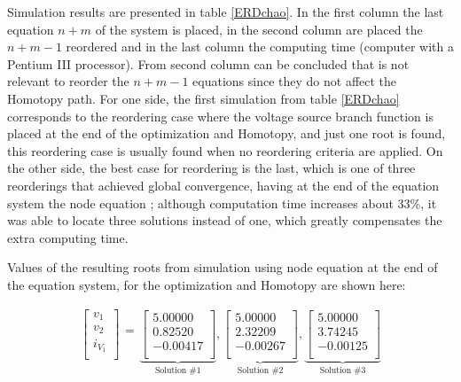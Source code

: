 \documentclass[conference,letterpaper,onecolumn,11pt]{IEEEtran}
\begin{document}
Simulation results are presented in table \ref{ERDchao}. In the first column the last equation $n+m$ of the system is placed, in the second column are placed the $n+m-1$ reordered and in the last column the computing time (computer with a Pentium III processor). From second column can be concluded that is not relevant to reorder the $n+m-1$ equations since they do not affect the Homotopy path. For one side, the first simulation from table \ref{ERDchao} corresponds to the reordering case where the voltage source branch function is placed at the end of the optimization and Homotopy, and just one root is found, this reordering case is usually found when no reordering criteria are applied. On the other side, the best case for reordering is the last, which is one of three reorderings that achieved global convergence, having at the end of the equation system the node equation ; although computation time increases about 33\%, it was able to locate three solutions instead of one, which greatly compensates the extra computing time.

Values of the resulting roots from simulation using node equation  at the end of the equation system, for the optimization and Homotopy are shown here:

\begin{displaymath}
\begin{array}{r}
\left[\begin{array}{r} v_1 \\ v_2  \\ i_{V_1}  \\ \end{array}\right]
\begin{array}{r}
 \\ = \\ \\
\end{array}
\underbrace{\left[\begin{array}{r}
5.00000 \\
0.82520  \\
-0.00417 \\
\end{array}\right]}_{\mbox{Solution \#1}},
\underbrace{\left[\begin{array}{r}
5.00000 \\
2.32209 \\
-0.00267 \\
\end{array}\right]}_{\mbox{Solution \#2}}, 
\underbrace{\left[\begin{array}{r}
 5.00000\\
 3.74245 \\
 -0.00125 \\
\end{array}\right]}_{\mbox{Solution \#3}}
\end{array}
\end{displaymath}
\end{document}

